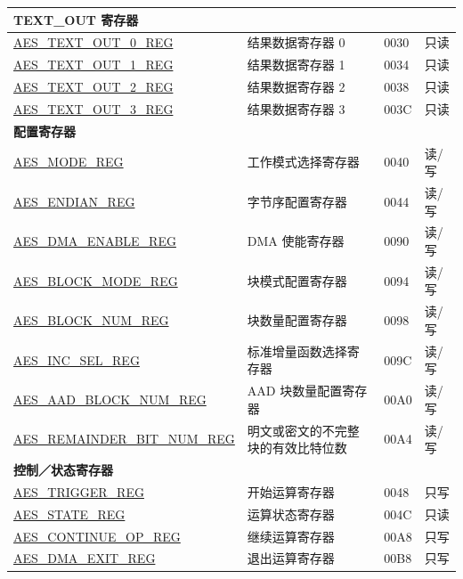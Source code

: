 \begin{longtable}{ | p{5.2cm} | p{6.6cm} | p{2cm} | p{1.2cm} | }
\multicolumn{4}{|l|}{\textbf{TEXT\_OUT 寄存器}} \\ \hline

\hyperref[regdesc:AESTEXTOUTnREG]{AES\_TEXT\_OUT\_0\_REG}		&	结果数据寄存器 0					& \hexprefix{}0030 & 只读 \\ \hline
\hyperref[regdesc:AESTEXTOUTnREG]{AES\_TEXT\_OUT\_1\_REG}		&	结果数据寄存器 1					& \hexprefix{}0034 & 只读 \\ \hline
\hyperref[regdesc:AESTEXTOUTnREG]{AES\_TEXT\_OUT\_2\_REG}		&	结果数据寄存器 2					& \hexprefix{}0038 & 只读 \\ \hline
\hyperref[regdesc:AESTEXTOUTnREG]{AES\_TEXT\_OUT\_3\_REG}		&	结果数据寄存器 3					& \hexprefix{}003C & 只读 \\ \hline

\multicolumn{4}{|l|}{\textbf{配置寄存器}} \\ \hline

\hyperref[regdesc:AESMODEREG]{AES\_MODE\_REG}				            & 工作模式选择寄存器			    & \hexprefix{}0040 & 读/写 \\ \hline
\hyperref[regdesc:AESENDIANREG]{AES\_ENDIAN\_REG}			            &	字节序配置寄存器				        & \hexprefix{}0044 & 读/写 \\ \hline
\hyperref[regdesc:AESDMAENABLEREG]{AES\_DMA\_ENABLE\_REG}		        &	DMA 使能寄存器					                & \hexprefix{}0090 & 读/写 \\ \hline
\hyperref[regdesc:AESBLOCKMODEREG]{AES\_BLOCK\_MODE\_REG}		        &	块模式配置寄存器			        & \hexprefix{}0094 & 读/写 \\ \hline
\hyperref[regdesc:AESBLOCKNUMREG]{AES\_BLOCK\_NUM\_REG}		   	        &	块数量配置寄存器			        & \hexprefix{}0098 & 读/写 \\ \hline
\hyperref[regdesc:AESINCSELREG]{AES\_INC\_SEL\_REG}			            &	标准增量函数选择寄存器               & \hexprefix{}009C & 读/写 \\ \hline
\hyperref[regdesc:AESAADBLOCKNUMREG]{AES\_AAD\_BLOCK\_NUM\_REG}	        &	AAD 块数量配置寄存器			    & \hexprefix{}00A0 & 读/写 \\ \hline
\hyperref[regdesc:AESREMAINDERBITNUMREG]{AES\_REMAINDER\_BIT\_NUM\_REG}	&	明文或密文的不完整块的有效比特位数	    & \hexprefix{}00A4 & 读/写 \\ \hline

\multicolumn{4}{|l|}{\textbf{控制／状态寄存器}} \\ \hline

\hyperref[regdesc:AESTRIGGERREG]{AES\_TRIGGER\_REG}			&	开始运算寄存器		& \hexprefix{}0048 & 只写 \\ \hline
\hyperref[regdesc:AESSTATEREG]{AES\_STATE\_REG}				&	运算状态寄存器			& \hexprefix{}004C & 只读 \\ \hline
\hyperref[regdesc:AESCONTINUEOPREG]{AES\_CONTINUE\_OP\_REG}		&	继续运算寄存器	& \hexprefix{}00A8 & 只写 \\ \hline
\hyperref[regdesc:AESDMAEXITREG]{AES\_DMA\_EXIT\_REG}		&	退出运算寄存器	& \hexprefix{}00B8 & 只写 \\ \hline


\end{longtable}

